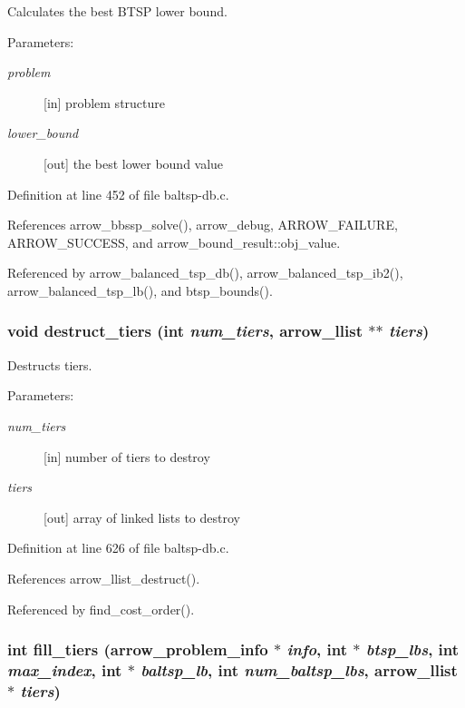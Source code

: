 Calculates the best BTSP lower bound. 

\begin{Desc}
\item[Parameters:]
\begin{description}
\item[{\em problem}]\mbox{[}in\mbox{]} problem structure \item[{\em lower\_\-bound}]\mbox{[}out\mbox{]} the best lower bound value \end{description}
\end{Desc}


Definition at line 452 of file baltsp-db.c.

References arrow\_\-bbssp\_\-solve(), arrow\_\-debug, ARROW\_\-FAILURE, ARROW\_\-SUCCESS, and arrow\_\-bound\_\-result::obj\_\-value.

Referenced by arrow\_\-balanced\_\-tsp\_\-db(), arrow\_\-balanced\_\-tsp\_\-ib2(), arrow\_\-balanced\_\-tsp\_\-lb(), and btsp\_\-bounds().\hypertarget{lib_2baltsp_2baltsp-db_8c_086f8eb237774105f487040ef6ac62df}{
\subsubsection[{destruct\_\-tiers}]{\setlength{\rightskip}{0pt plus 5cm}void destruct\_\-tiers (int {\em num\_\-tiers}, \/  {\bf arrow\_\-llist} $\ast$$\ast$ {\em tiers})}}
\label{lib_2baltsp_2baltsp-db_8c_086f8eb237774105f487040ef6ac62df}


Destructs tiers. 

\begin{Desc}
\item[Parameters:]
\begin{description}
\item[{\em num\_\-tiers}]\mbox{[}in\mbox{]} number of tiers to destroy \item[{\em tiers}]\mbox{[}out\mbox{]} array of linked lists to destroy \end{description}
\end{Desc}


Definition at line 626 of file baltsp-db.c.

References arrow\_\-llist\_\-destruct().

Referenced by find\_\-cost\_\-order().\hypertarget{lib_2baltsp_2baltsp-db_8c_42c557c4a5d3133300ce63b8b5e291c5}{
\subsubsection[{fill\_\-tiers}]{\setlength{\rightskip}{0pt plus 5cm}int fill\_\-tiers ({\bf arrow\_\-problem\_\-info} $\ast$ {\em info}, \/  int $\ast$ {\em btsp\_\-lbs}, \/  int {\em max\_\-index}, \/  int $\ast$ {\em baltsp\_\-lb}, \/  int {\em num\_\-baltsp\_\-lbs}, \/  {\bf arrow\_\-llist} $\ast$ {\em tiers})}}
\label{lib_2baltsp_2baltsp-db_8c_42c557c4a5d3133300ce63b8b5e291c5}


